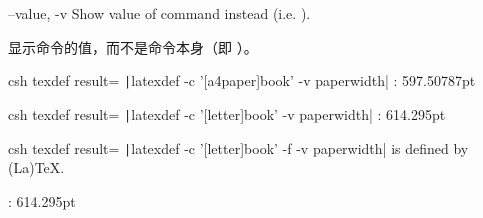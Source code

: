 \begin{docKey}
  {--value, -v}{}%
  {}%
  Show value of command instead (i.e. ).

  显示命令的值，而不是命令本身（即 ）。




\begin{tcblisting}{%
csh texdef result={
\texttt|latexdef -c '[a4paper]{book}' -v paperwidth|
}
}
\the\paperwidth:
597.50787pt
\end{tcblisting}


\begin{tcblisting}{%
csh texdef result={
\texttt|latexdef -c '[letter]{book}'  -v paperwidth|
}
}
\the\paperwidth:
614.295pt
\end{tcblisting}

\begin{tcblisting}{%
csh texdef result={
\texttt|latexdef -c '[letter]{book}' -f  -v paperwidth|
}
}
\paperwidth is defined by (La)TeX.

\the\paperwidth:
614.295pt
\end{tcblisting}

\end{docKey}